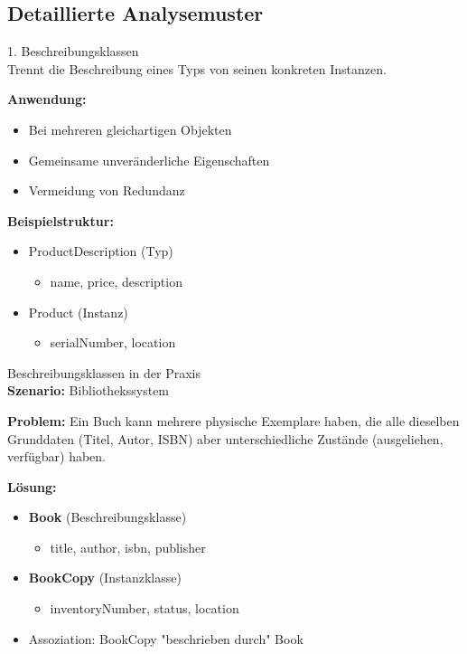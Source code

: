 \subsection{Detaillierte Analysemuster}

\begin{concept}{1. Beschreibungsklassen}\\
Trennt die Beschreibung eines Typs von seinen konkreten Instanzen.

\textbf{Anwendung:}
\begin{itemize}
    \item Bei mehreren gleichartigen Objekten
    \item Gemeinsame unveränderliche Eigenschaften
    \item Vermeidung von Redundanz
\end{itemize}

\textbf{Beispielstruktur:}
\begin{itemize}
    \item ProductDescription (Typ)
    \begin{itemize}
        \item name, price, description
    \end{itemize}
    \item Product (Instanz)
    \begin{itemize}
        \item serialNumber, location
    \end{itemize}
\end{itemize}
\end{concept}

\begin{example2}{Beschreibungsklassen in der Praxis}\\
\textbf{Szenario:} Bibliothekssystem

\textbf{Problem:} 
Ein Buch kann mehrere physische Exemplare haben, die alle dieselben Grunddaten (Titel, Autor, ISBN) aber unterschiedliche Zustände (ausgeliehen, verfügbar) haben.

\textbf{Lösung:}
\begin{itemize}
    \item \textbf{Book} (Beschreibungsklasse)
    \begin{itemize}
        \item title, author, isbn, publisher
    \end{itemize}
    \item \textbf{BookCopy} (Instanzklasse)
    \begin{itemize}
        \item inventoryNumber, status, location
    \end{itemize}
    \item Assoziation: BookCopy "beschrieben durch" Book
\end{itemize}
\end{example2}

